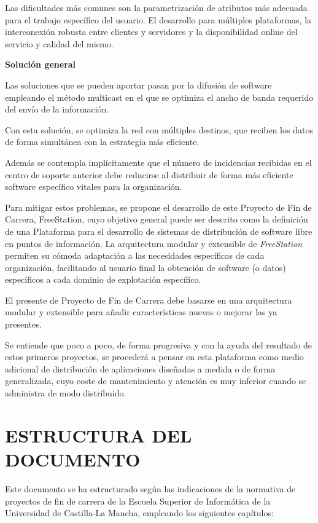 Las dificultades más comunes son la parametrización de atributos más adecuada
para el trabajo específico del usuario. El desarrollo para múltiples
plataformas, la interconexión robusta entre clientes y servidores y la
disponibilidad online del servicio y calidad del mismo.

\textbf{Solución general}

Las soluciones que se pueden aportar pasan por la difusión de software
empleando el método multicast \cite{Wil99} en el que se optimiza el ancho de
banda requerido del envío de la información.

Con esta solución, se optimiza la red con múltiples destinos, que reciben los
datos de forma simultánea con la estrategia más eficiente.

\newpage

Además se contempla implícitamente que el número de
incidencias recibidas en el centro de soporte anterior debe reducirse al
distribuir de forma más eficiente software específico vitales para la organización.

Para mitigar estos problemas, se propone el desarrollo de este Proyecto de Fin
de Carrera, FreeStation, cuyo objetivo general puede ser descrito como la
definición de una Plataforma para el desarrollo de sistemas de distribución de
software libre en puntos de información. La arquitectura modular y extensible de
\emph{FreeStation} permiten su cómoda adaptación a las necesidades específicas
de cada organización, facilitando al usuario final la obtención de software (o
datos) específicos a cada dominio de explotación específico.

El presente de Proyecto de Fin de Carrera debe basarse en una arquitectura
modular y extensible para añadir características nuevas o mejorar las ya
presentes.

Se entiende que poco a poco, de forma progresiva y con la ayuda del resultado de
estos primeros proyectos, se procederá a pensar en esta plataforma como medio
adicional de distribución de aplicaciones diseñadas a medida o de forma
generalizada, cuyo coste de mantenimiento y atención es muy inferior cuando se administra de modo
distribuido.

\section{\uppercase{Estructura del documento}}

Este documento se ha estructurado según las indicaciones de la normativa de
proyectos de fin de carrera de la Escuela Superior de Informática de la
Universidad de Castilla-La Mancha, empleando los siguientes capítulos:


